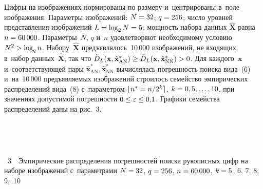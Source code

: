 \begin{multicols}{2}
  
  
  Цифры на изображениях нормированы по размеру и~центрированы в~поле 
изображения. Параметры изображений: $N\hm=32$; $q\hm=256$; число 
уровней пред\-став\-ле\-ния изоб\-ра\-же\-ний $L\hm=\log_2 N \hm=5$; мощность набора 
данных $\hat{\mathbf{X}}$ равна $n\hm=60\,000$. Параметры~$N$, $q$ и~$n$ 
удовлетворяют необходимому условию $N^2\hm> \log_q n$. 
Набору~$\hat{\mathbf{X}}$ предъявлялось~10\,000 изображений, не входящих 
в~набор данных~$\hat{\mathbf{X}}$, так что $\tilde{D}_L(\mathbf{x}, 
\hat{\mathbf{x}}^*_{\mathrm{AN}})\hm\geq \tilde{D}_L (\mathbf{x}, 
\hat{\mathbf{x}}^*_{\mathrm{NN}})\hm>0$. Для каждого~$\mathbf{x}$ 
и~соответствующей пары $\hat{\mathbf{x}}^*_{\mathrm{AN}}, 
\hat{\mathbf{x}}^*_{\mathrm{NN}}$ вы\-чис\-ля\-лась погрешность поиска вида~(6) 
и~на~10\,000 предъяв\-ля\-емых изображений строилось семейство эмпирических 
распределений вида~(8) с~па\-ра\-мет\-ром $\lfloor n^*\hm= n/2^k \rceil$, 
$k\hm=0,5,\ldots ,10$, 
при значениях допустимой погрешности $0\hm\leq\varepsilon\hm\leq 0{,}1$. 
Графики семейства распределений даны на рис.~3.

\setcounter{figure}{3}
\begin{figure*}[b] %
\vspace*{6pt}
\begin{center}
\mbox{%
\epsfxsize=160mm
}
\end{center}
\vspace*{-6pt}
\end{figure*}


{ \begin{center}  %
 \vspace*{-3pt}
 \mbox{%
\epsfxsize=77.97mm
}


\end{center}

\vspace*{-6pt}


\noindent
{{\figurename~3}\ \ \small{Эмпирические распределения 
  погрешностей поиска рукописных цифр на наборе
   изображений с~па\-ра\-мет\-ра\-ми $N \hm= 32$, $q \hm= 256$, $n \hm= 60\,000$,
$k\hm=5$, 6, 7, 8, 9,~10}}

}


\addtocounter{figure}{1}
 

\end{multicols}
